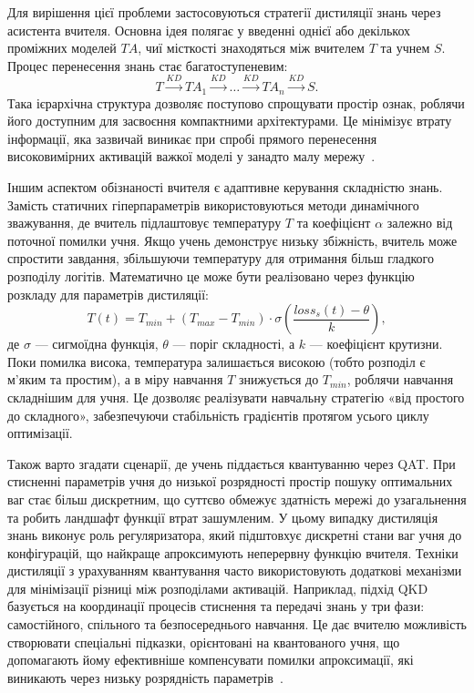 \documentclass{pma-mthesis}
\begin{document}
Для вирішення цієї проблеми застосовуються стратегії дистиляції знань через асистента вчителя. Основна ідея полягає у введенні однієї або декількох проміжних моделей $TA$, чиї місткості знаходяться між вчителем $T$ та учнем $S$. Процес перенесення знань стає багатоступеневим:
\begin{equation}
    T \xrightarrow{KD} TA_1 \xrightarrow{KD} \dots \xrightarrow{KD} TA_n \xrightarrow{KD} S.
\end{equation}
Така ієрархічна структура дозволяє поступово спрощувати простір ознак, роблячи його доступним для засвоєння компактними архітектурами. Це мінімізує втрату інформації, яка зазвичай виникає при спробі прямого перенесення високовимірних активацій важкої моделі у занадто малу мережу~\cite{mirzadeh2020improved}.

Іншим аспектом обізнаності вчителя є адаптивне керування складністю знань. Замість статичних гіперпараметрів використовуються методи динамічного зважування, де вчитель підлаштовує температуру $T$ та коефіцієнт $\alpha$ залежно від поточної помилки учня. Якщо учень демонструє низьку збіжність, вчитель може спростити завдання, збільшуючи температуру для отримання більш гладкого розподілу логітів. Математично це може бути реалізовано через функцію розкладу для параметрів дистиляції:
\begin{equation}
    T(t) = T_{min} + (T_{max} - T_{min}) \cdot \sigma \left( \frac{loss_s(t) - \theta}{k} \right),
\end{equation}
де $\sigma$ --- сигмоїдна функція, $\theta$ --- поріг складності, а $k$ --- коефіцієнт крутизни. Поки помилка висока, температура залишається високою (тобто розподіл є м'яким та простим), а в міру навчання $T$ знижується до $T_{min}$, роблячи навчання складнішим для учня. Це дозволяє реалізувати навчальну стратегію «від простого до складного», забезпечуючи стабільність градієнтів протягом усього циклу оптимізації.

Також варто згадати сценарії, де учень піддається квантуванню через QAT. При стисненні параметрів учня до низької розрядності простір пошуку оптимальних ваг стає більш дискретним, що суттєво обмежує здатність мережі до узагальнення та робить ландшафт функції втрат зашумленим. У цьому випадку дистиляція знань виконує роль регуляризатора, який підштовхує дискретні стани ваг учня до конфігурацій, що найкраще апроксимують неперервну функцію вчителя. Техніки дистиляції з урахуванням квантування часто використовують додаткові механізми для мінімізації різниці між розподілами активацій. Наприклад, підхід QKD~\cite{kim2020qkd} базується на координації процесів стиснення та передачі знань у три фази: самостійного, спільного та безпосереднього навчання. Це дає вчителю можливість створювати спеціальні підказки, орієнтовані на квантованого учня, що допомагають йому ефективніше компенсувати помилки апроксимації, які виникають через низьку розрядність параметрів~\cite{kim2020qkd}.
\end{document}
